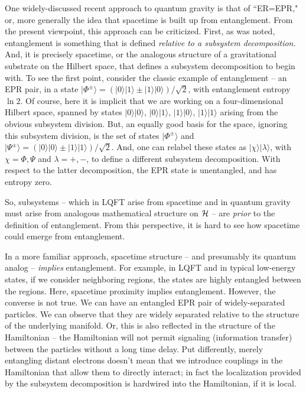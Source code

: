 
One widely-discussed recent approach to quantum gravity is that of ``ER=EPR," or, more generally the idea that spacetime is built up from entanglement.  From the present viewpoint, this approach can be criticized.  First, as was noted, entanglement is something that is defined {\it relative to a subsystem decomposition.}  And, it is precisely spacetime, or the analogous structure of a gravitational substrate on the Hilbert space, that defines a subsystem decomposition to begin with. To see the first point, consider the classic example of entanglement -- an EPR pair, in a state $|\Phi^\pm\rangle = (|0\rangle |1\rangle \pm |1\rangle|0\rangle)/\sqrt 2$, with entanglement entropy $\ln 2$.  Of course, here it is implicit that we are working on a four-dimensional Hilbert space, spanned by states $|0\rangle|0\rangle$, $|0\rangle |1\rangle$, $|1\rangle|0\rangle$, $|1\rangle|1\rangle$ arising from the obvious subsystem division.  But, an equally good basis for the space, ignoring this subsystem division, is the set of states $|\Phi^\pm\rangle$ and $|\Psi^\pm\rangle = (|0\rangle |0\rangle \pm |1\rangle|1\rangle)/\sqrt 2$.  And, one can relabel these states as $|\chi\rangle |\lambda\rangle$, with $\chi=\Phi,\Psi$ and $\lambda=+,-$, to define a different subsystem decomposition.  With respect to the latter decomposition, the EPR state is unentangled, and has entropy zero.

So, subsystems -- which in LQFT arise from spacetime and in quantum gravity must arise from analogous mathematical structure on ${\cal H}$ -- are {\it prior} to the definition of entanglement.  From this perspective, it is hard to see how spacetime could emerge from entanglement.  

In a more familiar approach,  spacetime structure -- and presumably its quantum analog -- {\it implies} entanglement.  For example, in LQFT and in typical low-energy states, if we consider neighboring regions, the states are highly entangled between the regions.  Here, spacetime proximity implies entanglement.  However, the converse is not true.  We can have an entangled EPR pair of widely-separated particles.  We can observe that they are widely separated relative to the structure of the underlying manifold.  Or, this is also reflected in the structure of the Hamiltonian -- the Hamiltonian will not permit signaling (information transfer) between the particles without a long time delay.  Put differently, merely entangling distant electrons doesn't mean that we introduce couplings in the Hamiltonian that allow them to directly interact; in fact the localization provided by the subsystem decomposition is hardwired into the Hamiltonian, if it is local.

